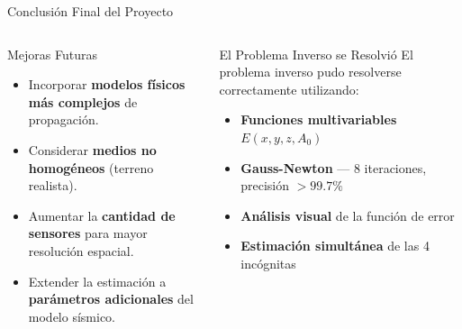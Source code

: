 


\begin{frame}{Conclusión Final del Proyecto}

    \begin{columns}[T]


        \begin{block}{Mejoras Futuras}
            \scriptsize
            \begin{itemize}
                \item Incorporar \textbf{modelos físicos más complejos} de propagación.
                \vspace{0.1cm}
                \item Considerar \textbf{medios no homogéneos} (terreno realista).
                \vspace{0.1cm}
                \item Aumentar la \textbf{cantidad de sensores} para mayor resolución espacial.
                \vspace{0.1cm}
                \item Extender la estimación a \textbf{parámetros adicionales} del modelo sísmico.
            \end{itemize}
        \end{block}


        \begin{exampleblock}{El Problema Inverso se Resolvió}
            \scriptsize
            El problema inverso pudo resolverse correctamente utilizando:
            \begin{itemize}
                \item \textbf{Funciones multivariables} $E(x,y,z,A_0)$
                \vspace{0.05cm}
                \item \textbf{Gauss-Newton} — 8 iteraciones, precisión $>99.7\%$
                \vspace{0.05cm}
                \item \textbf{Análisis visual} de la función de error
                \vspace{0.05cm}
                \item \textbf{Estimación simultánea} de las 4 incógnitas
            \end{itemize}
        \end{exampleblock}


\end{columns}
\end{frame}
